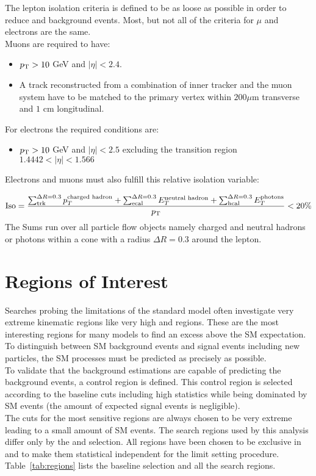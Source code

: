 The lepton isolation criteria is defined to be as loose as possible in order to reduce \wpj and \ttbar background events. Most, but not all of the criteria for $\mu$ and electrons are the same.\\
Muons are required to have:
\begin{itemize}
 \item $p_{\text{T}} > 10$ GeV and $|\eta| < 2.4$.
 \item A track reconstructed from a combination of inner tracker and the muon system have to be matched to the primary vertex within $200 \mu$m transverse and $1$ cm  longitudinal.
\end{itemize}
For electrons the required conditions are:
\begin{itemize}
 \item $p_{\text{T}} > 10$ GeV and $|\eta| < 2.5$ excluding the transition region $1.4442 < |\eta| < 1.566$ 
\end{itemize}
Electrons and muons must also fulfill this relative isolation variable:
 

\begin{equation}
      \text{Iso}= \frac{  \sum_{\text{trk}}^{\Delta R=0.3}p_{T}^{\text{charged hadron}}+\sum_{\text{ecal}}^{\Delta R=0.3}E_{T}^{\text{neutral hadron}}+\sum_{\text{hcal}}^{\Delta R=0.3}E_{T}^{\text{photons}} } {p_{\text{T}}} < 20\%
\label{eq:isolation}
\end{equation}
The Sums run over all particle flow objects namely charged and neutral hadrons or photons \pt within a cone with a radius $\Delta R=0.3$ around the lepton.




\section{Regions of Interest}
\label{sec:regions}
Searches probing the limitations of the standard model often investigate very extreme kinematic regions like very high \HT and \MHT regions. These are the most interesting regions for many models to find an excess above the SM expectation.\\
To distinguish between SM background events and signal events including new particles, the SM processes must be predicted as precisely as possible.\\
To validate that the background estimations are capable of predicting the background events, a control region is defined. This control region is selected according to the baseline cuts including high statistics while being dominated by SM events (the amount of expected signal events is negligible).\\
The cuts for the most sensitive regions are always chosen to be very extreme leading to a small amount of SM events. The search regions used by this analysis differ only by the \HT and \MHT selection. All regions have been chosen to be exclusive in \HT and \MHT to make them statistical independent for the limit setting procedure. 
Table~\ref{tab:regions} lists the baseline selection and all the search regions. 

